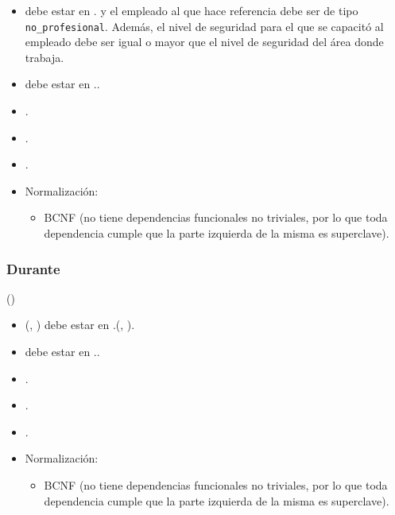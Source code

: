     \begin{itemize}
        \item {} debe estar en . y el 
            empleado al que hace referencia debe ser de tipo 
            \verb|no_profesional|. Además, el nivel de seguridad para el que se
            capacitó al empleado
            debe ser igual o mayor que el nivel de seguridad del área donde
            trabaja.
        \item {} debe estar en ..
        \item {}.
        \item {}.
        \item {}.

        \item Normalización:

            \begin{itemize}
                \item BCNF (no tiene dependencias funcionales no triviales, por
                    lo que toda dependencia cumple que la parte izquierda de la
                    misma es superclave).
            \end{itemize}
    \end{itemize}

\subsubsection{Durante}

    ()

    \begin{itemize}
        \item (, ) debe estar en .(, ).
        \item {} debe estar en ..

        \item {}.
        \item {}.
        \item {}.

        \item Normalización:

            \begin{itemize}
                \item BCNF (no tiene dependencias funcionales no triviales, por
                    lo que toda dependencia cumple que la parte izquierda de la
                    misma es superclave).
            \end{itemize}
    \end{itemize}

